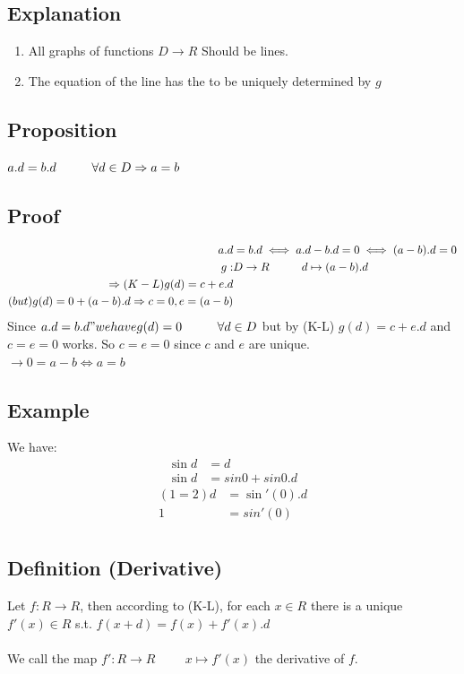 \documentclass[a4paper,12pt]{article}
\begin{document}
\subsection*{Explanation}
\begin{enumerate}
\item All graphs of functions $D \rightarrow R$ Should be lines.
\item The equation of the line has the to be uniquely determined by $g$
\end{enumerate}
\subsection*{Proposition}
$a.d=b.d \hspace{1cm} \forall d \in D \\ \Rightarrow a = b $
\subsection*{Proof}
\begin{align*}
a.d & = b.d \iff a.d-b.d = 0 \iff (a-b).d = 0 \\
g: & D \rightarrow R \hspace{1cm} d \mapsto (a-b).d \\
\Rightarrow (K-L) g(d) = c+e.d \\
\text(but) g(d) = 0 + (a-b).d \Rightarrow c=0, e=(a-b) \\
\end{align*}
Since $a.d = b.d" we have g(d) = 0 \hspace{1cm} \forall d \in D$ but by (K-L) $g(d) = c+e.d$ and $c=e=0$ works. So $c=e=0$ since $c$ and $e$ are unique. \\
$\rightarrow  0 = a-b \iff a = b$
\subsection*{Example}
We have:
\begin{align}
\sin{d} & = d \\
\sin{d} & = sin{0} + sin{0}.d
\end{align}
\begin{align*}
(1 = 2) d &= \sin'(0).d \\
1 &= sin'(0) \\
\end{align*}
\subsection*{Definition (Derivative)}
Let $f: R \rightarrow R$, then according to (K-L), for each $x \in R$ there is a unique $f'(x) \in R$ s.t. $f(x+d) = f(x) + f'(x).d$ \\\\
We call the map $f': R \rightarrow R \hspace{1cm} x \mapsto f'(x)$ the derivative of $f$.
\end{document}
